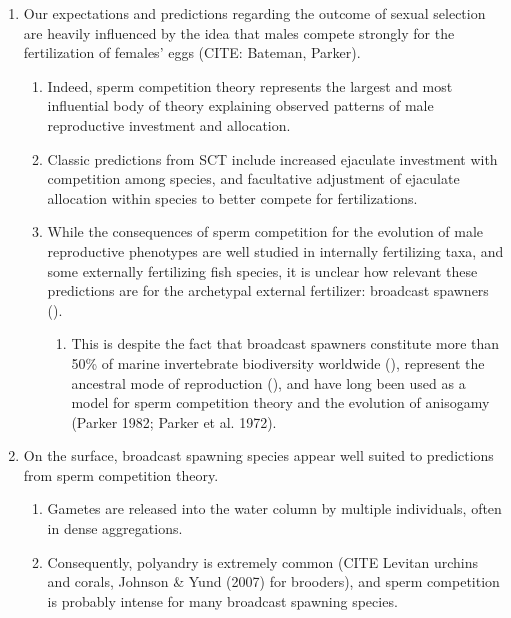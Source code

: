 \documentclass{article}
\begin{document}
\begin{enumerate}
	\item Our expectations and predictions regarding the outcome of sexual selection are heavily influenced by the idea that males compete strongly for the fertilization of females' eggs (CITE: Bateman, Parker).
		\begin{enumerate}
			\item Indeed, sperm competition theory represents the largest and most influential body of theory explaining observed patterns of male reproductive investment and allocation. 
			\item Classic predictions from SCT include increased ejaculate investment with competition among species, and facultative adjustment of ejaculate allocation within species to better compete for fertilizations.
			\item While the consequences of sperm competition for the evolution of male reproductive phenotypes are well studied in internally fertilizing taxa, and some externally fertilizing fish species, it is unclear how relevant these predictions are for the archetypal external fertilizer: broadcast spawners (\citealt{BodeMarshall2007,Olito2015}). 
				\begin{enumerate}
					\item This is despite the fact that broadcast spawners constitute more than 50\% of marine invertebrate biodiversity worldwide (\citealt{MonroMarshall2015}), represent the ancestral mode of reproduction (), and have long been used as a model for sperm competition theory and the evolution of anisogamy (Parker 1982; Parker et al. 1972).
				\end{enumerate}
		\end{enumerate}

	\item On the surface, broadcast spawning species appear well suited to predictions from sperm competition theory.
		\begin{enumerate}
			\item Gametes are released into the water column by multiple individuals, often in dense aggregations.
			\item Consequently, polyandry is extremely common (CITE Levitan urchins and corals, Johnson \& Yund (2007) for brooders), and sperm competition is probably intense for many broadcast spawning species.
		\end{enumerate}


\end{enumerate}
\end{document}

